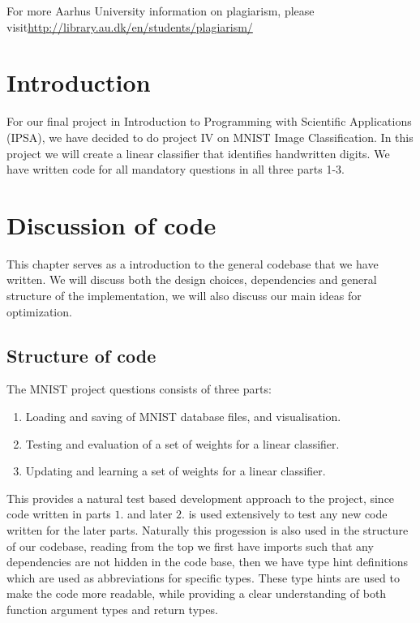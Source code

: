 \documentclass[a4paper,oneside,article,english]{memoir}
\begin{document}
\begin{raggedleft}
For more Aarhus University information on plagiarism, please visit\newline \url{http://library.au.dk/en/students/plagiarism/}
\end{raggedleft}
\newpage



\chapter{Introduction}  
\label{ch:introduction}

For our final project in Introduction to Programming with Scientific
Applications (IPSA), we have decided to do project IV on MNIST Image
Classification. In this project we will create a linear classifier that
identifies handwritten digits. We have written code for all mandatory questions in all three
parts 1-3.



\chapter{Discussion of code}  
\label{ch:structure_of_code}
This chapter serves as a introduction to the general codebase that we have
written. We will discuss both the design choices, dependencies and general
structure of the implementation, we will also discuss our main ideas for optimization.

\section{Structure of code}  
\label{sec:structure_of_code}

The MNIST project questions consists of three parts:
\begin{enumerate}
  \item Loading and saving of MNIST database files, and visualisation.
  \item Testing and evaluation of a set of weights for a linear classifier.
  \item Updating and learning a set of weights for a linear classifier.
\end{enumerate}
This provides a natural test based development approach to the project, since
code written in parts $1.$ and later $2.$ is used extensively to test any new
code written for the later parts. Naturally this progession is also used in the
structure of our codebase, reading from the top we first have imports such that
any dependencies are not hidden in the code base, then we have type hint
definitions which are used as abbreviations for specific types. These type hints
are used to make the code more readable, while providing a clear understanding
of both function argument types and return types. 
\end{document}
